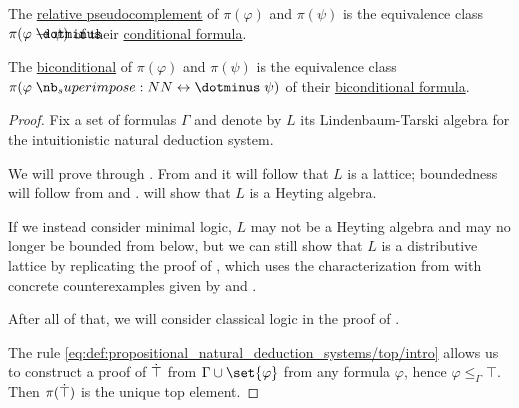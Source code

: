 \begin{proposition}
\begin{thmenum}[resume=thm:lindenbaum_tarski_algebras]
     The \hyperref[def:heyting_algebra]{relative pseudocomplement} of \( \pi(\varphi) \) and \( \pi(\psi) \) is the equivalence class \( \pi(\varphi \synimplies \psi) \) of their \hyperref[def:propositional_alphabet/connectives/conditional]{conditional formula}.

     The \hyperref[def:heyting_algebra/biconditional]{biconditional} of \( \pi(\varphi) \) and \( \pi(\psi) \) is the equivalence class \( \pi(\varphi \syniff \psi) \) of their \hyperref[def:propositional_alphabet/connectives/biconditional]{biconditional formula}.
  \end{thmenum}
\end{proposition}
\begin{proof}
  Fix a set of formulas \( \Gamma \) and denote by \( L \) its Lindenbaum-Tarski algebra for the intuitionistic natural deduction system.

  We will prove  through . From  and  it will follow that \( L \) is a lattice; boundedness will follow from  and .  will show that \( L \) is a Heyting algebra.

  If we instead consider minimal logic, \( L \) may not be a Heyting algebra and may no longer be bounded from below, but we can still show that \( L \) is a distributive lattice by replicating the proof of , which uses the characterization from  with concrete counterexamples given by  and .

  After all of that, we will consider classical logic in the proof of .

   The rule \eqref{eq:def:propositional_natural_deduction_systems/top/intro} allows us to construct a proof of \( \dot\top \) from \( \Gamma \cup \set{ \varphi } \) from any formula \( \varphi \), hence \( \varphi \leq_\Gamma \top \). Then \( \pi(\dot\top) \) is the unique top element.


\end{proof}
